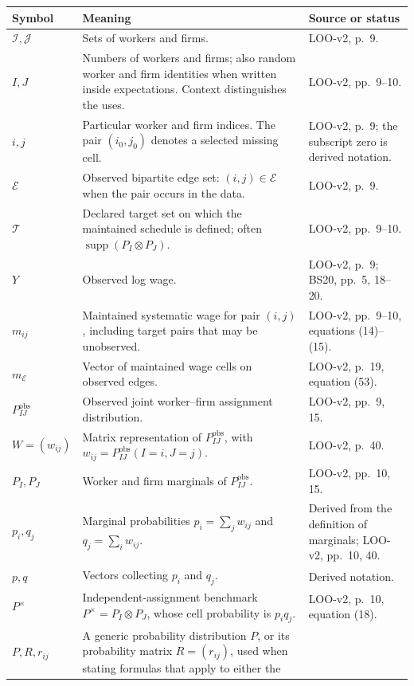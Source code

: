 \documentclass[11pt]{article}
\begin{document}
\begin{longtable}{p{}p{}p{}}
\textbf{Symbol} & \textbf{Meaning} & \textbf{Source or status} \\
\hline
\(\mathcal I,\mathcal J\) & Sets of workers and firms. & LOO-v2, p.\ 9. \\
\(I,J\) & Numbers of workers and firms; also random worker and firm identities
when written inside expectations.  Context distinguishes the uses. &
LOO-v2, pp.\ 9--10. \\
\(i,j\) & Particular worker and firm indices.  The pair
\((i_0,j_0)\) denotes a selected missing cell. & LOO-v2, p.\ 9; the subscript
zero is derived notation. \\
\(\mathcal E\) & Observed bipartite edge set:
\((i,j)\in\mathcal E\) when the pair occurs in the data. & LOO-v2, p.\ 9. \\
\(\mathcal T\) & Declared target set on which the maintained schedule is
defined; often \(\operatorname{supp}(P_I\otimes P_J)\). & LOO-v2, pp.\ 9--10. \\
\(Y\) & Observed log wage. & LOO-v2, p.\ 9; BS20, pp.\ 5, 18--20. \\
\(m_{ij}\) & Maintained systematic wage for pair \((i,j)\), including target
pairs that may be unobserved. & LOO-v2, pp.\ 9--10, equations (14)--(15). \\
\(m_{\mathcal E}\) & Vector of maintained wage cells on observed edges. &
LOO-v2, p.\ 19, equation (53). \\
\(P^{\mathrm{obs}}_{IJ}\) & Observed joint worker--firm assignment
distribution. & LOO-v2, pp.\ 9, 15. \\
\(W=(w_{ij})\) & Matrix representation of \(P^{\mathrm{obs}}_{IJ}\), with
\(w_{ij}=P^{\mathrm{obs}}_{IJ}(I=i,J=j)\). & LOO-v2, p.\ 40. \\
\(P_I,P_J\) & Worker and firm marginals of \(P^{\mathrm{obs}}_{IJ}\). &
LOO-v2, pp.\ 10, 15. \\
\(p_i,q_j\) & Marginal probabilities
\(p_i=\sum_jw_{ij}\) and \(q_j=\sum_iw_{ij}\). & Derived from the definition
of marginals; LOO-v2, pp.\ 10, 40. \\
\(p,q\) & Vectors collecting \(p_i\) and \(q_j\). & Derived notation. \\
\(P^\times\) & Independent-assignment benchmark
\(P^\times=P_I\otimes P_J\), whose cell probability is \(p_iq_j\). &
LOO-v2, p.\ 10, equation (18). \\
\(P,R,r_{ij}\) & A generic probability distribution \(P\), or its probability
matrix \(R=(r_{ij})\), used when stating formulas that apply to either the

\end{longtable}
\end{document}
